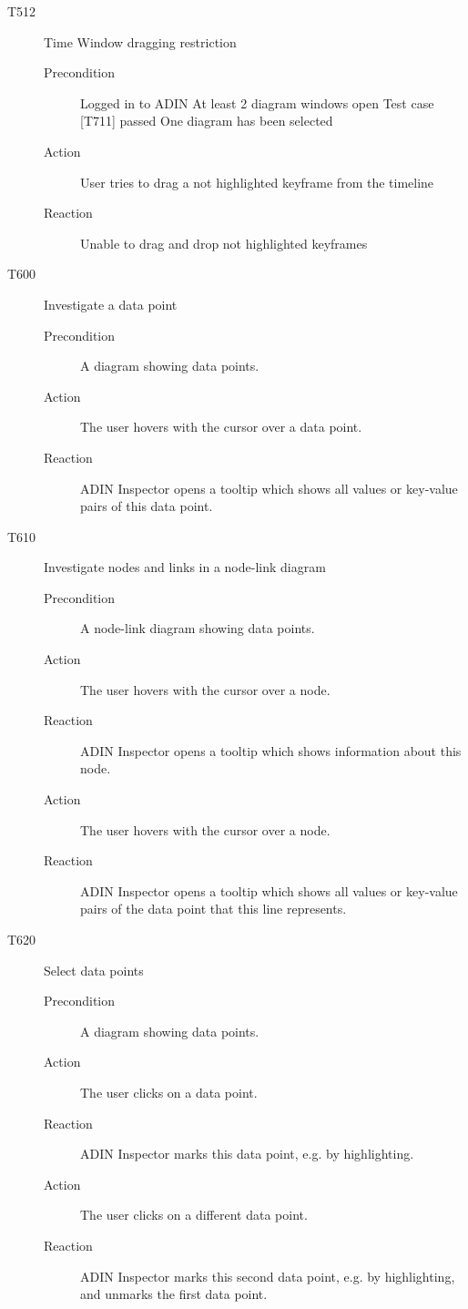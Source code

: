 \documentclass[twoside, english, draft]{Pflichtenheft}
\begin{document}
\begin{description}
	\item[T512] Time Window dragging restriction
	      \begin{description}
		      \item[Precondition]
		            Logged in to ADIN
		            At least 2 diagram windows open
		            Test case [T711] passed
		            One diagram has been selected
		      \item[Action]
		            User tries to drag a not highlighted keyframe from the timeline
		      \item[Reaction]
		            Unable to drag and drop not highlighted keyframes
	      \end{description}

	\item[T600] Investigate a data point
	      \begin{description}
		      \item[Precondition]
		            A diagram showing data points.
		      \item[Action]
		            The user hovers with the cursor over a data point.
		      \item[Reaction]
		            ADIN Inspector opens a tooltip which shows all values or key-value pairs of this data point.
	      \end{description}

	\item[T610] Investigate nodes and links in a node-link diagram
	      \begin{description}
		      \item[Precondition]
		            A node-link diagram showing data points.
		      \item[Action]
		            The user hovers with the cursor over a node.
		      \item[Reaction]
		            ADIN Inspector opens a tooltip which shows information about this node.
		      \item[Action]
		            The user hovers with the cursor over a node.
		      \item[Reaction]
		            ADIN Inspector opens a tooltip which shows all values or key-value pairs of the data point that this line represents.

	      \end{description}

	\item[T620] Select data points
	      \begin{description}
		      \item[Precondition]
		            A diagram showing data points.
		      \item[Action]
		            The user clicks on a data point.
		      \item[Reaction]
		            ADIN Inspector marks this data point, e.g. by highlighting.
		      \item[Action]
		            The user clicks on a different data point.
		      \item[Reaction]
		            ADIN Inspector marks this second data point, e.g. by highlighting, and unmarks the first data point.
	      \end{description}


\end{description}
\end{document}
